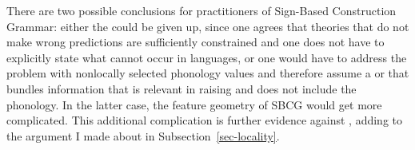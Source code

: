 \documentclass[output=paper,biblatex,babelshorthands,newtxmath,draftmode,colorlinks,citecolor=brown]{langscibook}
\begin{document}
There are two possible conclusions for practitioners of Sign-Based Construction Grammar: either the \motherf could be given up,
since one agrees that theories that do not make wrong predictions are sufficiently constrained and
one does not have to explicitly state what cannot occur in languages, or one would have to address
the problem with nonlocally selected phonology values and therefore assume a \synsem or \localf that
bundles information that is relevant in raising and does not include the
phonology.
In the latter case, the feature geometry of SBCG would get more complicated. This additional
complication is further evidence against \mother, adding to the argument I made about \mother in Subsection~\ref{sec-locality}.

\label{sec-local-feature-sbcg}
\end{document}
